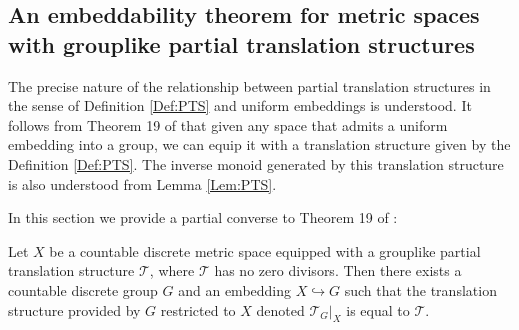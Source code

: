 \begin{corollary}
\subsection{An embeddability theorem for metric spaces with grouplike partial translation structures}

The precise nature of the relationship between partial translation structures in the sense of Definition \ref{Def:PTS} and uniform embeddings is understood. It follows from Theorem 19 of \cite{MR2363428} that given any space that admits a uniform embedding into a group, we can equip it with a translation structure given by the Definition \ref{Def:PTS}. The inverse monoid generated by this translation structure is also understood from Lemma \ref{Lem:PTS}.

In this section we provide a partial converse to Theorem 19 of \cite{MR2363428}:

\begin{theorem}\label{thm:T2}
Let $X$ be a countable discrete metric space equipped with a grouplike partial translation structure $\mathcal{T}$, where $\mathcal{T}$ has no zero divisors. Then there exists a countable discrete group $G$ and an embedding $X \hookrightarrow G$ such that the translation structure provided by $G$ restricted to $X$ denoted $\mathcal{T}_{G}|_{X}$ is equal to $\mathcal{T}$.
\end{theorem}


\end{corollary}
